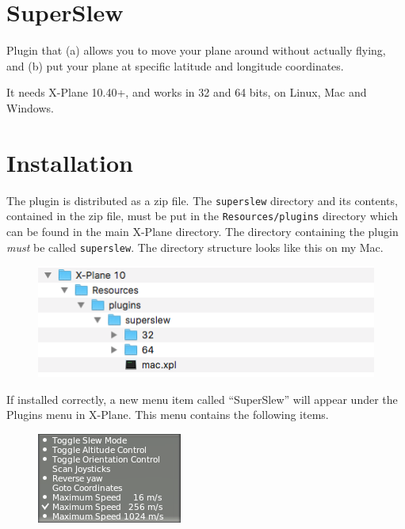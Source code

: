 \documentclass[a4paper,12pt]{article}
\begin{document}
\section*{SuperSlew}

Plugin that (a) allows you to move your plane around without actually
flying, and (b) put your plane at specific latitude and longitude coordinates.

\vspace{0.5\baselineskip}
It needs X-Plane 10.40+, and works in 32 and 64 bits, on Linux, Mac
and Windows.

\vspace{\baselineskip}
\section*{Installation}

The plugin is distributed as a zip file. The \texttt{superslew}
directory and its contents, contained in the zip file, must be put in
the \texttt{Resources/plugins} directory which can be found in the
main X-Plane directory. The directory containing the plugin
\textsl{must} be called \texttt{superslew}. The directory structure
looks like this on my Mac.

\begin{figure}[h!]%
\centering
\includegraphics[scale=1]{slewinstall.png}
\label{fig:slewinstall}
\end{figure}

If installed correctly, a new menu item called ``SuperSlew'' will
appear under the Plugins menu in X-Plane. This menu contains the
following items.

\begin{figure}[h!]%
\centering
\includegraphics[scale=1]{slewstandard.png}
\label{fig:slewstandard}
\end{figure}
\end{document}
